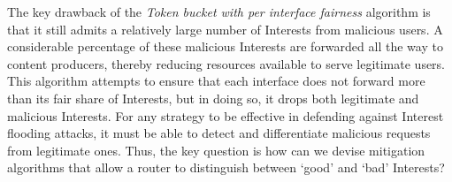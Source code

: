 


The key drawback of the {\it Token bucket with per interface fairness} algorithm is that it still admits a relatively large number of Interests from malicious users. A considerable percentage of these malicious Interests are forwarded all the way to content producers, thereby reducing resources available to serve legitimate users.  This algorithm attempts to ensure that each interface does not forward more than its fair share of Interests, but in doing so, it drops both legitimate and malicious Interests. For any strategy to be effective in defending against Interest flooding attacks, it must be able to detect and differentiate malicious requests from legitimate ones. 
Thus, the key question is how can we devise mitigation algorithms that allow a router to distinguish between `good' and `bad' Interests? 


  

